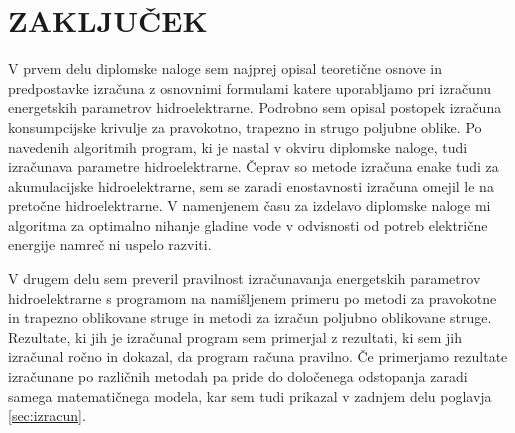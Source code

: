 
\chapter{ZAKLJUČEK}

V prvem delu diplomske naloge sem najprej opisal teoretične osnove in predpostavke izračuna z osnovnimi formulami katere uporabljamo pri izračunu energetskih parametrov hidroelektrarne. Podrobno sem opisal postopek izračuna konsumpcijske krivulje za pravokotno, trapezno in strugo poljubne oblike. Po navedenih algoritmih program, ki je nastal v okviru diplomske naloge, tudi izračunava parametre hidroelektrarne. Čeprav so metode izračuna enake tudi za akumulacijske hidroelektrarne, sem se zaradi enostavnosti izračuna omejil le na pretočne hidroelektrarne. V namenjenem času za izdelavo diplomske naloge mi algoritma za optimalno nihanje gladine vode v odvisnosti od potreb električne energije namreč ni uspelo razviti.


V drugem delu sem preveril pravilnost izračunavanja energetskih parametrov hidroelektrarne s programom na namišljenem primeru po metodi za pravokotne in trapezno oblikovane struge in metodi za izračun poljubno oblikovane struge. Rezultate, ki jih je izračunal program sem primerjal z rezultati, ki sem jih izračunal ročno in dokazal, da program računa pravilno. Če primerjamo rezultate izračunane po različnih metodah pa pride do določenega odstopanja zaradi samega matematičnega modela, kar sem tudi prikazal v zadnjem delu poglavja \ref{sec:izracun}.


